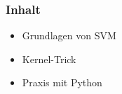 \begin{frame}
    \frametitle{Inhalt}

    \begin{itemize}
        \item Grundlagen von SVM
        \item Kernel-Trick
        \item Praxis mit Python
    \end{itemize}
\end{frame}

